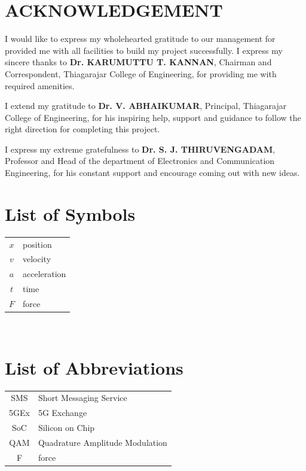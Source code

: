 \documentclass[a4paper,12pt]{report} %
\makeatletter
\newcommand\mainmatter{%
    \cleardoublepage
  \pagenumbering{arabic}}
\makeatother
\begin{document}
\chapter*{ACKNOWLEDGEMENT}
I would like to express my wholehearted gratitude to our management
for provided me with all facilities to build my project successfully. I express
my sincere thanks to \textbf{Dr. KARUMUTTU T. KANNAN}, Chairman and
Correspondent, Thiagarajar College of Engineering, for providing me with
required amenities.\par
I extend my gratitude to \textbf{Dr. V. ABHAIKUMAR}, Principal,
Thiagarajar College of Engineering, for his inspiring help, support and
guidance to follow the right direction for completing this project.\par
I express my extreme gratefulness to \textbf{Dr. S. J. THIRUVENGADAM},
Professor and Head of the department of Electronics and Communication
Engineering, for his constant support and encourage coming out with new
ideas.

\tableofcontents
\makeatother

\listoffigures
\listoftables
\chapter*{List of Symbols}
\begin{tabular}{cp{}}
  $x$ & position \\
  $v$ & velocity \\
  $a$ & acceleration \\
  $t$ & time \\
  $F$ & force
\end{tabular}\\
\chapter*{List of Abbreviations}
\begin{tabular}{cp{}}
  SMS & Short Messaging Service \\
  5GEx & 5G Exchange \\
  SoC & Silicon on Chip \\
  QAM & Quadrature Amplitude Modulation \\
  F & force
\end{tabular}\\
\mainmatter
\end{document}
